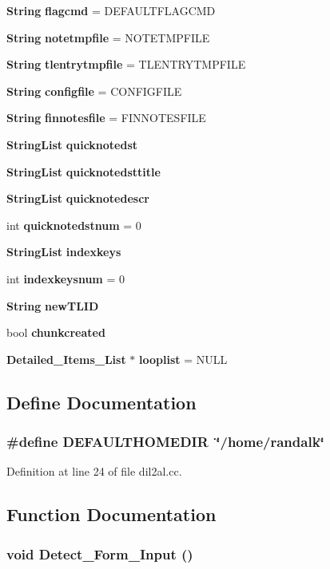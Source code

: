 \begin{CompactItemize}
{\bf String} {\bf flagcmd} = DEFAULTFLAGCMD
\item 
{\bf String} {\bf notetmpfile} = NOTETMPFILE
\item 
{\bf String} {\bf tlentrytmpfile} = TLENTRYTMPFILE
\item 
{\bf String} {\bf configfile} = CONFIGFILE
\item 
{\bf String} {\bf finnotesfile} = FINNOTESFILE
\item 
{\bf String\-List} {\bf quicknotedst}
\item 
{\bf String\-List} {\bf quicknotedsttitle}
\item 
{\bf String\-List} {\bf quicknotedescr}
\item 
int {\bf quicknotedstnum} = 0
\item 
{\bf String\-List} {\bf indexkeys}
\item 
int {\bf indexkeysnum} = 0
\item 
{\bf String} {\bf new\-TLID}
\item 
bool {\bf chunkcreated}
\item 
{\bf Detailed\_\-Items\_\-List} $\ast$ {\bf looplist} = NULL
\end{CompactItemize}


\subsection{Define Documentation}
\subsubsection{\setlength{\rightskip}{0pt plus 5cm}\#define DEFAULTHOMEDIR\ \char`\"{}/home/randalk\char`\"{}}\label{dil2al_8cc_a0}




Definition at line 24 of file dil2al.cc.

\subsection{Function Documentation}
\subsubsection{\setlength{\rightskip}{0pt plus 5cm}void Detect\_\-Form\_\-Input ()}\label{dil2al_8cc_a110}




